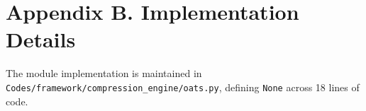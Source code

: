 \section*{Appendix B. Implementation Details}
The module implementation is maintained in \texttt{Codes/framework/compression\_engine/oats.py}, defining \texttt{None} across 18 lines of code.
